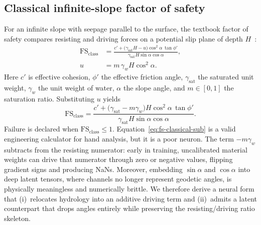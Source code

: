 \subsection{Classical infinite-slope factor of safety}
\label{sec:classical-fs}
For an infinite slope with seepage parallel to the surface, the textbook factor of safety compares resisting and driving forces on a potential slip plane of depth \(H\)~\cite{skempton1957stability}:
\begin{equation}
\label{eq:fs-classical}
\begin{split}
\mathrm{FS}_{\mathrm{class}}
&=
\frac{c'+\bigl(\gamma_{\mathrm{sat}}H-u\bigr)
\cos^{2}\alpha\,\tan\phi'}
{\gamma_{\mathrm{sat}}H\sin\alpha\cos\alpha},\\[0.35em]
u&=m\,\gamma_w H\cos^{2}\alpha.
\end{split}
\end{equation}
Here \(c'\) is effective cohesion, \(\phi'\) the effective friction angle, \(\gamma_{\mathrm{sat}}\) the saturated unit weight, \(\gamma_w\) the unit weight of water, \(\alpha\) the slope angle, and \(m\in[0,1]\) the saturation ratio. Substituting \(u\) yields
\begin{equation}
\label{eq:fs-classical-sub}
\mathrm{FS}_{\mathrm{class}}
=
\frac{c'+\bigl(\gamma_{\mathrm{sat}}-m\gamma_w\bigr)
H\cos^{2}\alpha\,\tan\phi'}
{\gamma_{\mathrm{sat}}H\sin\alpha\cos\alpha}.
\end{equation}
Failure is declared when \(\mathrm{FS}_{\mathrm{class}}\le 1\). Equation~\eqref{eq:fs-classical-sub} is a valid engineering calculator for hand analysis, but it is a poor neuron. The term \(-m\gamma_w\) subtracts from the resisting numerator: early in training, uncalibrated material weights can drive that numerator through zero or negative values, flipping gradient signs and producing NaNs. Moreover, embedding \(\sin\alpha\) and \(\cos\alpha\) into deep latent tensors, where channels no longer represent geodetic angles, is physically meaningless and numerically brittle. We therefore derive a neural form that (i)~relocates hydrology into an additive driving term and (ii)~admits a latent counterpart that drops angles entirely while preserving the resisting/driving ratio skeleton.

